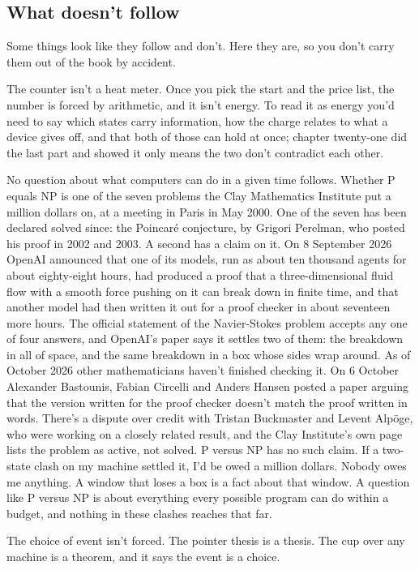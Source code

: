 \documentclass[11pt,twoside]{article}
\theoremstyle{thielethm}
\theoremstyle{thieledef}
\theoremstyle{thieledef}
\theoremstyle{thieledef}
\theoremstyle{thielethm}
\theoremstyle{thieleobs}
\theoremstyle{thielethm}
\begin{document}
\subsection{What doesn't follow}

Some things look like they follow and don't. Here they are, so you don't carry them out of the book by accident.

The counter isn't a heat meter. Once you pick the start and the price list, the number is forced by arithmetic, and it isn't energy. To read it as energy you'd need to say which states carry information, how the charge relates to what a device gives off, and that both of those can hold at once; chapter twenty-one did the last part and showed it only means the two don't contradict each other.

No question about what computers can do in a given time follows. Whether P equals NP is one of the seven problems the Clay Mathematics Institute put a million dollars on, at a meeting in Paris in May 2000. One of the seven has been declared solved since: the Poincaré conjecture, by Grigori Perelman, who posted his proof in 2002 and 2003. A second has a claim on it. On 8 September 2026 OpenAI announced that one of its models, run as about ten thousand agents for about eighty-eight hours, had produced a proof that a three-dimensional fluid flow with a smooth force pushing on it can break down in finite time, and that another model had then written it out for a proof checker in about seventeen more hours. The official statement of the Navier-Stokes problem accepts any one of four answers, and OpenAI's paper says it settles two of them: the breakdown in all of space, and the same breakdown in a box whose sides wrap around. As of October 2026 other mathematicians haven't finished checking it. On 6 October Alexander Bastounis, Fabian Circelli and Anders Hansen posted a paper arguing that the version written for the proof checker doesn't match the proof written in words. There's a dispute over credit with Tristan Buckmaster and Levent Alpöge, who were working on a closely related result, and the Clay Institute's own page lists the problem as active, not solved. P versus NP has no such claim. If a two-state clash on my machine settled it, I'd be owed a million dollars. Nobody owes me anything. A window that loses a box is a fact about that window. A question like P versus NP is about everything every possible program can do within a budget, and nothing in these clashes reaches that far.

The choice of event isn't forced. The pointer thesis is a thesis. The cup over any machine is a theorem, and it says the event is a choice.
\end{document}
